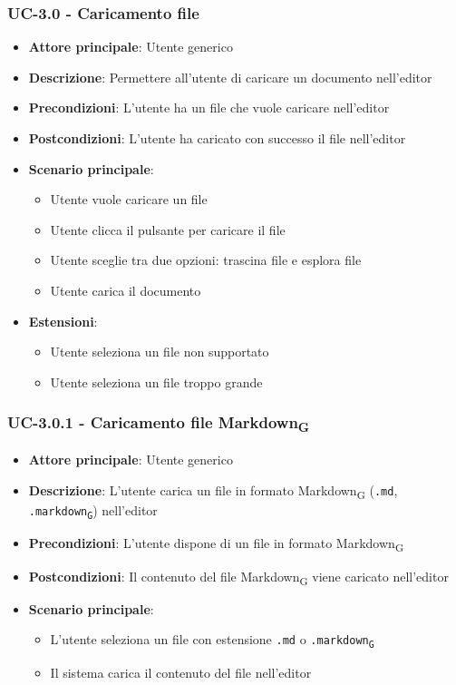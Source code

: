 \documentclass[11pt,a4paper]{article}
\newcommand{\gls}[1]{#1\textsubscript{G}}
\begin{document}
\subsubsection{UC-3.0 - Caricamento file}
\begin{itemize}
    \item \textbf{Attore principale}: Utente generico
    \item \textbf{Descrizione}: Permettere all'utente di caricare un documento nell'editor
    \item \textbf{Precondizioni}: L'utente ha un file che vuole caricare nell'editor
    \item \textbf{Postcondizioni}: L'utente ha caricato con successo il file nell'editor
    \item \textbf{Scenario principale}:
        \begin{itemize}
            \item Utente vuole caricare un file
            \item Utente clicca il pulsante per caricare il file
            \item Utente sceglie tra due opzioni: trascina file e esplora file
            \item Utente carica il documento
        \end{itemize}
    \item \textbf{Estensioni}:
        \begin{itemize}
            \item Utente seleziona un file non supportato
            \item Utente seleziona un file troppo grande
        \end{itemize}
\end{itemize}

\subsubsection{UC-3.0.1 - Caricamento file \gls{Markdown}}
\begin{itemize}
    \item \textbf{Attore principale}: Utente generico
    \item \textbf{Descrizione}: L'utente carica un file in formato \gls{Markdown} (\texttt{.md}, \texttt{.\gls{markdown}}) nell'editor
    \item \textbf{Precondizioni}: L'utente dispone di un file in formato \gls{Markdown}
    \item \textbf{Postcondizioni}: Il contenuto del file \gls{Markdown} viene caricato nell'editor
    \item \textbf{Scenario principale}:
        \begin{itemize}
            \item L'utente seleziona un file con estensione \texttt{.md} o \texttt{.\gls{markdown}}
            \item Il sistema carica il contenuto del file nell'editor
        \end{itemize}
\end{itemize}
\end{document}

